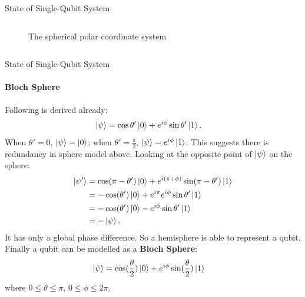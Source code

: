 \documentclass{beamer}
\begin{document}
\begin{frame}{State of Single-Qubit System\tiny\cite{blochsphere}}
{\begin{columns}
\begin{figure}
      \caption{The spherical polar coordinate system\tiny\cite{sphericalpolarcoordinate}}
    \end{figure}
  \end{columns}
  }%
\end{frame}

\begin{frame}{State of Single-Qubit System\tiny\cite{blochsphere}}
  \framesubtitle{Bloch Sphere}
  {\tiny
  Following is derived already:
  \begin{align*}
    \ket{\psi} &= \cos\theta'\ket{0}+e^{i\phi}\sin\theta'\ket{1} .
  \end{align*}
  When $\theta'=0$, $\ket{\psi}=\ket{0}$; when $\theta'=\frac{\pi}2$, $\ket{\psi}=e^{i\phi}\ket{1}$.
  This suggests there is redundancy in sphere model above.
  Looking at the opposite point of $\ket{\psi}$ on the sphere:
  \begin{align*}
    \ket{\psi'} &= \cos(\pi-\theta')\ket{0}+e^{i(\pi+\phi)}\sin(\pi-\theta')\ket{1} \\
     &= -\cos(\theta')\ket{0}+e^{i\pi}e^{i\phi}\sin\theta'\ket{1} \\
     &= -\cos(\theta')\ket{0}-e^{i\phi}\sin\theta'\ket{1} \\
     &= -\ket{\psi} .
  \end{align*}
  It has only a global phase difference. So a hemisphere is able to represent a qubit. Finally a qubit can be modelled as a \textbf{Bloch Sphere}:
  \begin{align*}
    \ket{\psi} &= \cos(\frac{\theta}2)\ket{0}+e^{i\phi}\sin(\frac{\theta}2)\ket{1}
  \end{align*}
  where $0\leqslant\theta\leqslant\pi$, $0\leqslant\phi\leqslant2\pi$.
  }%
\end{frame}
\end{document}
